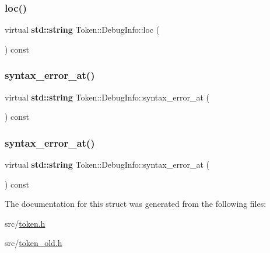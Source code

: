 \mbox{\label{struct_token_1_1_debug_info_a0860d9b875240dafa0e00756d27e55bb}} 
\subsubsection{\texorpdfstring{loc()}{loc()}\hspace{0.1cm}{\footnotesize\ttfamily [2/2]}}
{\footnotesize\ttfamily virtual \textbf{ std\+::string} Token\+::\+Debug\+Info\+::loc (\begin{DoxyParamCaption}{ }\end{DoxyParamCaption}) const\hspace{0.3cm}{\ttfamily [pure virtual]}}

\mbox{\label{struct_token_1_1_debug_info_a4d66aa65422c236198bbcc616bba250f}} 
\subsubsection{\texorpdfstring{syntax\+\_\+error\+\_\+at()}{syntax\_error\_at()}\hspace{0.1cm}{\footnotesize\ttfamily [1/2]}}
{\footnotesize\ttfamily virtual \textbf{ std\+::string} Token\+::\+Debug\+Info\+::syntax\+\_\+error\+\_\+at (\begin{DoxyParamCaption}{ }\end{DoxyParamCaption}) const\hspace{0.3cm}{\ttfamily [pure virtual]}}

\mbox{\label{struct_token_1_1_debug_info_a4d66aa65422c236198bbcc616bba250f}} 
\subsubsection{\texorpdfstring{syntax\+\_\+error\+\_\+at()}{syntax\_error\_at()}\hspace{0.1cm}{\footnotesize\ttfamily [2/2]}}
{\footnotesize\ttfamily virtual \textbf{ std\+::string} Token\+::\+Debug\+Info\+::syntax\+\_\+error\+\_\+at (\begin{DoxyParamCaption}{ }\end{DoxyParamCaption}) const\hspace{0.3cm}{\ttfamily [pure virtual]}}



The documentation for this struct was generated from the following files\+:\begin{DoxyCompactItemize}
\item 
src/\hyperlink{token_8h}{token.\+h}\item 
src/\hyperlink{token__old_8h}{token\+\_\+old.\+h}\end{DoxyCompactItemize}
